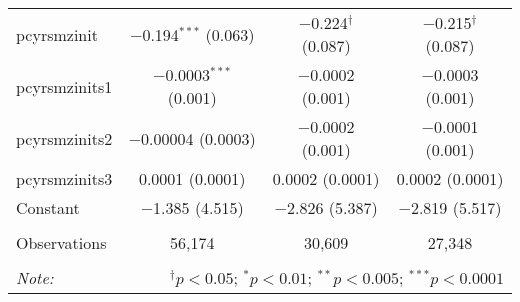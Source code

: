 \begin{table}[!htbp]
\begin{tabular}{@{\extracolsep{5pt}}lccc}
  pcyrsmzinit & $-$0.194$^{***}$ (0.063) & $-$0.224$^{\dagger}$ (0.087) & $-$0.215$^{\dagger}$ (0.087) \\ 
  pcyrsmzinits1 & $-$0.0003$^{***}$ (0.001) & $-$0.0002 (0.001) & $-$0.0003 (0.001) \\ 
  pcyrsmzinits2 & $-$0.00004 (0.0003) & $-$0.0002 (0.001) & $-$0.0001 (0.001) \\ 
  pcyrsmzinits3 & 0.0001 (0.0001) & 0.0002 (0.0001) & 0.0002 (0.0001) \\ 
  Constant & $-$1.385 (4.515) & $-$2.826 (5.387) & $-$2.819 (5.517) \\ 
 \hline \\[-1.8ex] 
Observations & 56,174 & 30,609 & 27,348 \\ 
\hline 
\hline \\[-1.8ex] 
\textit{Note:}  & \multicolumn{3}{r}{$^{\dagger} p<0.05$; $^{*} p<0.01$; $^{**} p<0.005$; $^{***} p<0.0001$} \\ 
\end{tabular} 
\end{table} 
